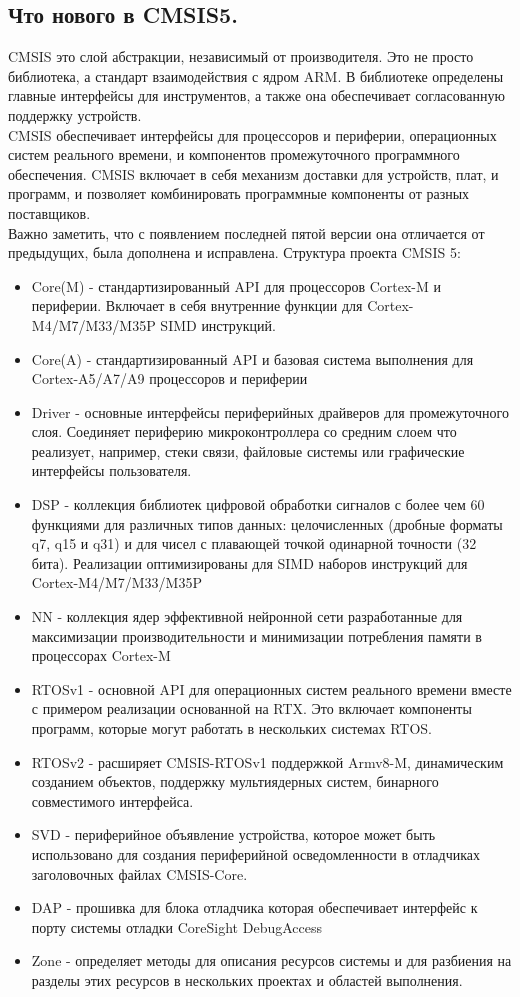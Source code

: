 \documentclass[12pt,a4paper]{article}
\begin{document}
\subsection{Что нового в CMSIS5.}
    CMSIS это слой абстракции, независимый от производителя. Это не просто
    библиотека, а стандарт взаимодействия с ядром ARM. В библиотеке определены
    главные интерфейсы для инструментов, а также она обеспечивает
    согласованную поддержку устройств. \\
    CMSIS обеспечивает интерфейсы для процессоров и периферии, операционных
    систем реального времени, и компонентов промежуточного программного
    обеспечения. CMSIS включает в себя механизм доставки для устройств, плат,
    и программ, и позволяет комбинировать программные компоненты от разных
    поставщиков. \\
    Важно заметить, что с появлением последней пятой версии она отличается от
    предыдущих, была дополнена и исправлена. Структура проекта CMSIS 5:
\begin{itemize}
    \item Core(M) - стандартизированный API для процессоров Cortex-M
    и периферии. Включает в себя внутренние функции для Cortex-M4/M7/M33/M35P
    SIMD инструкций.
    \item Core(A) - стандартизированный API и базовая система выполнения для
    Cortex-A5/A7/A9 процессоров и периферии
    \item Driver - основные интерфейсы периферийных драйверов для промежуточного
    слоя. Соединяет периферию микроконтроллера со средним слоем что реализует,
    например, стеки связи, файловые системы или графические интерфейсы
    пользователя.
    \item DSP - коллекция библиотек цифровой обработки сигналов с более чем
    60 функциями для различных типов
    данных: целочисленных (дробные форматы q7, q15 и q31) и для чисел с
    плавающей точкой одинарной точности (32 бита). Реализации оптимизированы
    для SIMD наборов инструкций для Cortex-M4/M7/M33/M35P
    \item NN - коллекция ядер эффективной нейронной сети разработанные для
    максимизации производительности и минимизации потребления памяти в
    процессорах Cortex-M
    \item RTOSv1 - основной API для операционных систем реального времени
    вместе с примером реализации основанной на RTX. Это включает компоненты
    программ, которые могут работать в нескольких системах RTOS.
    \item RTOSv2 - расширяет CMSIS-RTOSv1 поддержкой Armv8-M, динамическим
    созданием объектов, поддержку мультиядерных систем, бинарного совместимого
    интерфейса.
    \item SVD - периферийное объявление устройства, которое может быть
    использовано для создания периферийной осведомленности в отладчиках
    заголовочных файлах CMSIS-Core.
    \item DAP - прошивка для блока отладчика которая обеспечивает интерфейс к
    порту системы отладки CoreSight DebugAccess
    \item Zone - определяет методы для описания ресурсов системы и для
    разбиения на разделы этих ресурсов в нескольких проектах и областей
    выполнения.
\end{itemize}
\end{document}
